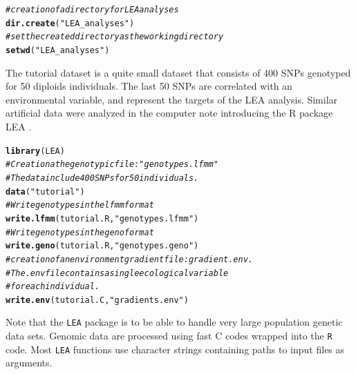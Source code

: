 \documentclass[12pt,a4paper,oneside]{article}\usepackage[]{graphicx}\usepackage[]{color}
\makeatletter
\newcommand{\hlstr}[1]{\textcolor[rgb]{0.192,0.494,0.8}{#1}}%
\newcommand{\hlcom}[1]{\textcolor[rgb]{0.678,0.584,0.686}{\textit{#1}}}%
\newcommand{\hlstd}[1]{\textcolor[rgb]{0.345,0.345,0.345}{#1}}%
\newcommand{\hlkwd}[1]{\textcolor[rgb]{0.737,0.353,0.396}{\textbf{#1}}}%
\newenvironment{kframe}{%
 \def\at@end@of@kframe{}%
 \ifinner\ifhmode%
  \def\at@end@of@kframe{\end{minipage}}%
  \begin{minipage}{\columnwidth}%
 \fi\fi%
 \def\FrameCommand##1{\hskip\@totalleftmargin \hskip-\fboxsep
 \colorbox{shadecolor}{##1}\hskip-\fboxsep
     \hskip-\linewidth \hskip-\@totalleftmargin \hskip\columnwidth}%
 \MakeFramed {\advance\hsize-\width
   \@totalleftmargin\z@ \linewidth\hsize
   \@setminipage}}%
 {\par\unskip\endMakeFramed%
 \at@end@of@kframe}
\newenvironment{knitrout}{}{} %
\makeatother
\begin{document}
\begin{knitrout}
\color{fgcolor}\begin{kframe}
\begin{alltt}
\hlcom{# creation of a directory for LEA analyses}
\hlkwd{dir.create}\hlstd{(}\hlstr{"LEA_analyses"}\hlstd{)}
\hlcom{# set the created directory as the working directory}
\hlkwd{setwd}\hlstd{(}\hlstr{"LEA_analyses"}\hlstd{)}
\end{alltt}
\end{kframe}
\end{knitrout}

\newline
\newline
The tutorial dataset is a quite small dataset that consists of 400 SNPs genotyped for 50 diploids individuals. The last 50 SNPs are correlated with an environmental variable, and represent the targets of the LEA analysis. Similar artificial data were analyzed in the computer note introducing the R package LEA \citep{Frichot_2015}. 

\begin{knitrout}
\color{fgcolor}\begin{kframe}
\begin{alltt}
\hlkwd{library}\hlstd{(LEA)}
\hlcom{# Creation a the genotypic file: "genotypes.lfmm"}
\hlcom{# The data include 400 SNPs for 50 individuals.}
\hlkwd{data}\hlstd{(}\hlstr{"tutorial"}\hlstd{)}
\hlcom{# Write genotypes in the lfmm format}
\hlkwd{write.lfmm}\hlstd{(tutorial.R,} \hlstr{"genotypes.lfmm"}\hlstd{)}
\hlcom{# Write genotypes in the geno format}
\hlkwd{write.geno}\hlstd{(tutorial.R,} \hlstr{"genotypes.geno"}\hlstd{)}
\hlcom{# creation of an environment gradient file: gradient.env.}
\hlcom{# The .env file contains a single ecological variable}
\hlcom{# for each individual.}
\hlkwd{write.env}\hlstd{(tutorial.C,} \hlstr{"gradients.env"}\hlstd{)}
\end{alltt}
\end{kframe}
\end{knitrout}

\newline
\newline
Note that the {\tt LEA} package is to be able to handle very large population 
genetic data sets. Genomic data are processed using fast C codes wrapped into the {\tt R} code. Most {\tt LEA} functions use character strings containing paths to input files as arguments.
\end{document}
